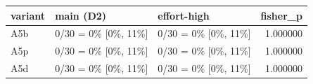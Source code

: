\begin{tabular}{lllr}
\toprule
variant & main (D2) & effort-high & fisher\_p \\
\midrule
A5b & 0/30 = 0\% [0\%, 11\%] & 0/30 = 0\% [0\%, 11\%] & 1.000000 \\
A5p & 0/30 = 0\% [0\%, 11\%] & 0/30 = 0\% [0\%, 11\%] & 1.000000 \\
A5d & 0/30 = 0\% [0\%, 11\%] & 0/30 = 0\% [0\%, 11\%] & 1.000000 \\
\bottomrule
\end{tabular}

